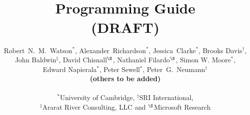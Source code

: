 \documentclass[12pt,twoside,openright,a4paper]{article}
\title{\CHERIhybridCOrCpp{} \\
  Programming Guide \\
  (DRAFT)}
\author{Robert~N.~M.~Watson$^*$,
    Alexander~Richardson$^*$,
    Jessica~Clarke$^*$,
    Brooks Davis$^\dagger$, \\
    John Baldwin$^\ddagger$,
    David Chisnall$^\S$,
    Nathaniel Filardo$^\S$,
    Simon W. Moore$^*$, \\
    Edward Napierala$^*$,
    Peter Sewell$^*$,
    Peter~G.~Neumann$^\dagger$
  \\
    \textbf{(others to be added)}
  \\
  \\
  $^*$University of Cambridge, $^\dagger$SRI International, \\
  $^\ddagger$Ararat River Consulting, LLC and $^\S$Microsoft Research}
\newcommand{\note}[2]{{\color{blue}[ Note: #1 - #2]}}
\renewcommand{\note}[2]{\relax\ifhmode\unskip\fi}
\newcommand{\psnote}[1]{\note{#1}{Peter S.}}
\newcommand*{\cpp}{\texorpdfstring{C\textsmaller[2]{\protect\nolinebreak[4]\hspace{-.05em}\raisebox{.45ex}{\textbf{++}}}}{C++}}
\newcommand*{\COrCpp}{C/\cpp{}}
\newcommand*{\purecapCOrCpp}{CHERI \COrCpp{}}
\newcommand*{\hybridCOrCpp}{Hybrid-Capability \COrCpp{}}
\newcommand*{\CHERIhybridCOrCpp}{CHERI \hybridCOrCpp{}}
\newcommand*{\CAndCpp}{C and \cpp{}}
\newcommand*{\hybridCAndCpp}{Hybrid-Capability \CAndCpp{}}
\newcommand*{\CHERIhybridCAndCpp}{CHERI \hybridCAndCpp{}}
\begin{document}
\sloppy

\maketitle


%
%
\newcommand{\abstracttext}{

\psnote{looking over quickly again, 2020-11-13, this talks \emph{about} \CHERIhybridCOrCpp{} and its uses, but only sort-of tells the reader what they concretely are and how to write code -- it mentions some types and qualifiers, but it's unclear whether it describes all of them, it doesn't describe library functions manipulating capabiltiies, and it lacks examples of actual code.  For the first of those, probably it would be useful to have a section summarising all the extensions, with their syntax.}
  
This document is an introduction to the \CHERIhybridCAndCpp{} programming
languages.
\hybridCOrCpp{} allows the selective use of CHERI capabilities from within an
otherwise unmodified, and Application Binary Interface (ABI)-compatible,
C/\cpp{}-language code base.
Its aim is to allow management of, and interoperation with, capability-enabled
code while using an integer rather than capability pointer implementation
internally.
Unlike pure-capability \purecapCOrCpp{}, \hybridCOrCpp{} defaults to an
integer implementation for pointers except where specifically annotated in the
program source code.
Due to the requirement for ABI compatibility, implied pointers within the
language runtime itself are also primarily implemented as integers rather than
capabilities.

\hybridCOrCpp{} primarily sees use in specialized low-level systems code that,
for compatibility or performance reasons, must use non-capability pointers, or
on the boundaries between pure-capability and conventional generated code.
Current use cases includes boot loaders, operating-system kernels, and
Inter-Process Communication (IPC) runtimes.
Potential future use cases include programs that have been formally verified
(which do not require dynamic memory safety) and code that has high static or
dynamic pointer density (leading to unaffordable memory-allocation footprints
or cache utilization and energy use).

}
\end{document}
